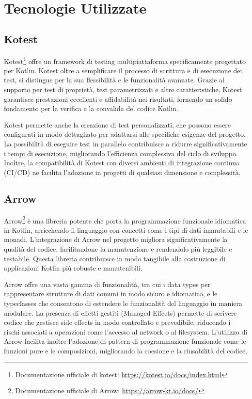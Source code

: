 \documentclass[12pt,a4paper,openright,twoside]{book}
\begin{document}
\section{Tecnologie Utilizzate}

\subsection{Kotest}
Kotest\footnote{
    Documentazione ufficiale di kotest: \url{https://kotest.io/docs/index.html}
} offre un framework di testing multipiattaforma specificamente progettato per Kotlin. Kotest oltre a semplificare il processo di scrittura e di esecuzione dei test, 
si distingue per la sua flessibilità e le funzionalità avanzate. Grazie al supporto per test di proprietà, test parametrizzati e altre caratteristiche, Kotest garantisce prestazioni 
eccellenti e affidabilità nei risultati, fornendo un solido fondamento per la verifica e la convalida del codice Kotlin.

Kotest permette anche la creazione di test personalizzati, che possono essere configurati in modo dettagliato per adattarsi alle specifiche esigenze del progetto. 
La possibilità di eseguire test in parallelo contribuisce a ridurre significativamente i tempi di esecuzione, migliorando l'efficienza complessiva del ciclo di sviluppo. 
Inoltre, la compatibilità di Kotest con diversi ambienti di integrazione continua (\ac{CI/CD}) ne facilita l'adozione in progetti di qualsiasi dimensione e complessità.

\subsection{Arrow}
Arrow\footnote{
    Documentazione ufficiale di Arrow: \url{https://arrow-kt.io/docs/}
} è una libreria potente che porta la programmazione funzionale idiomatica in Kotlin, arricchendo il linguaggio con concetti come i tipi di dati immutabili e le monadi. 
L'integrazione di Arrow nel progetto migliora significativamente la qualità del codice, facilitandone la manutenzione e rendendolo più leggibile e testabile. 
Questa libreria contribuisce in modo tangibile alla costruzione di applicazioni Kotlin più robuste e manutenibili.

Arrow offre una vasta gamma di funzionalità, tra cui i data types per rappresentare strutture di dati comuni in modo sicuro e idiomatico, e le typeclasses che consentono di estendere 
le funzionalità del linguaggio in maniera modulare. La presenza di effetti gestiti (Managed Effects) permette di scrivere codice che gestisce side effects in modo controllato e 
prevedibile, riducendo i rischi associati a operazioni come l'accesso al network o al filesystem. L'utilizzo di Arrow facilita inoltre l'adozione di pattern di programmazione 
funzionale come le funzioni pure e le composizioni, migliorando la coesione e la riusabilità del codice.
\end{document}
